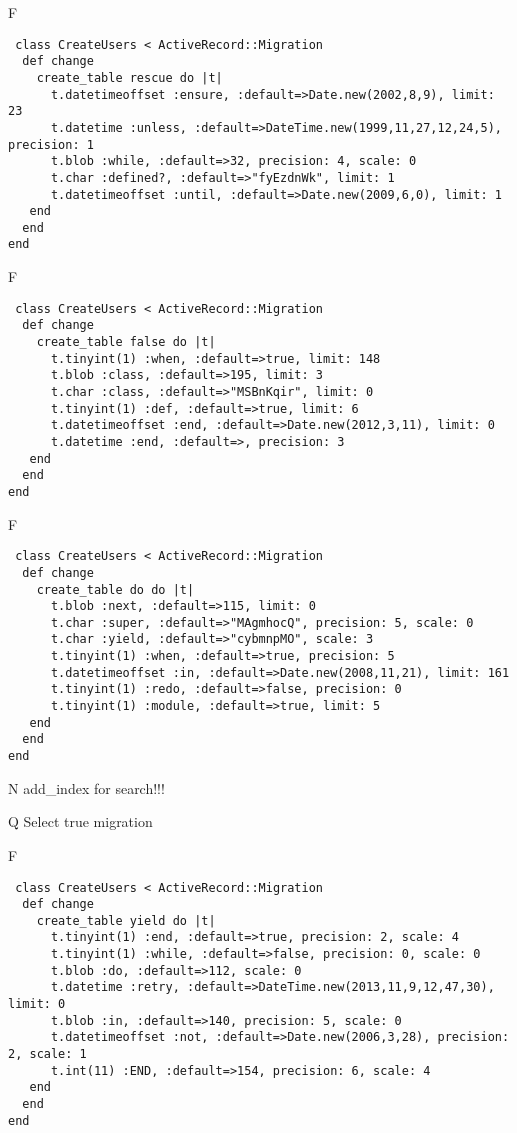 F
\begin{verbatim}
 class CreateUsers < ActiveRecord::Migration 
  def change 
    create_table rescue do |t| 
      t.datetimeoffset :ensure, :default=>Date.new(2002,8,9), limit: 23
      t.datetime :unless, :default=>DateTime.new(1999,11,27,12,24,5), precision: 1
      t.blob :while, :default=>32, precision: 4, scale: 0
      t.char :defined?, :default=>"fyEzdnWk", limit: 1
      t.datetimeoffset :until, :default=>Date.new(2009,6,0), limit: 1
   end 
  end 
end
\end{verbatim}

F
\begin{verbatim}
 class CreateUsers < ActiveRecord::Migration 
  def change 
    create_table false do |t| 
      t.tinyint(1) :when, :default=>true, limit: 148
      t.blob :class, :default=>195, limit: 3
      t.char :class, :default=>"MSBnKqir", limit: 0
      t.tinyint(1) :def, :default=>true, limit: 6
      t.datetimeoffset :end, :default=>Date.new(2012,3,11), limit: 0
      t.datetime :end, :default=>, precision: 3
   end 
  end 
end
\end{verbatim}

F
\begin{verbatim}
 class CreateUsers < ActiveRecord::Migration 
  def change 
    create_table do do |t| 
      t.blob :next, :default=>115, limit: 0
      t.char :super, :default=>"MAgmhocQ", precision: 5, scale: 0
      t.char :yield, :default=>"cybmnpMO", scale: 3
      t.tinyint(1) :when, :default=>true, precision: 5
      t.datetimeoffset :in, :default=>Date.new(2008,11,21), limit: 161
      t.tinyint(1) :redo, :default=>false, precision: 0
      t.tinyint(1) :module, :default=>true, limit: 5
   end 
  end 
end
\end{verbatim}
N
add_index for search!!!
  
Q
Select true migration

F
\begin{verbatim}
 class CreateUsers < ActiveRecord::Migration 
  def change 
    create_table yield do |t| 
      t.tinyint(1) :end, :default=>true, precision: 2, scale: 4
      t.tinyint(1) :while, :default=>false, precision: 0, scale: 0
      t.blob :do, :default=>112, scale: 0
      t.datetime :retry, :default=>DateTime.new(2013,11,9,12,47,30), limit: 0
      t.blob :in, :default=>140, precision: 5, scale: 0
      t.datetimeoffset :not, :default=>Date.new(2006,3,28), precision: 2, scale: 1
      t.int(11) :END, :default=>154, precision: 6, scale: 4
   end 
  end 
end
\end{verbatim}

